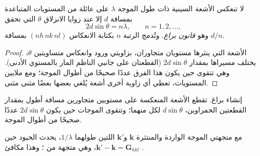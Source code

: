 \begin{theorem}\label{thm:b3:x-ray-diffraction:bragg}
لا تنعكس الأشعة السينية ذات طول الموجة $\lambda$ على عائلة من المستويات المتباعدة بمسافة $d$
إلا عند زوايا الانزلاق $\theta$ التي تحقق
\[
2d\sin\theta = n\lambda, \qquad n = 1, 2, \dots,
\]
وهو \emph{قانون براغ}. وتُدمج الرتبة $n$ بكتابة
الانعكاس $(nh\,nk\,nl)$ بمسافة $d/n$.
\end{theorem}

\begin{proof}
الأشعة التي ينثرها مستويان متجاوران، بزاويتي ورود 
وانعكاس متساويتين $\theta$، يختلف مسيراها بمقدار $2d\sin\theta$ (القطعتان على جانبي
الناظم المار بالمستوي الأدنى). وهي تتقوى حين يكون هذا الفرق
عددًا صحيحًا من أطوال الموجة؛ ومع ملايين المستويات، تعطي أي زاوية أخرى
أشعة يُلغي بعضها بعضًا مثنى مثنى.
\end{proof}

\begin{omfigure}

{\small إنشاء براغ. تقطع الأشعة المنعكسة على مستويين متجاورين
مسافة أطول بمقدار القطعتين الحمراوين، $d\sin\theta$ لكل منهما؛ وتتقوى الموجات حين يكون
$2d\sin\theta$ عددًا صحيحًا من أطوال الموجة.}
\end{omfigure}

\begin{proposition}\label{prop:b3:x-ray-diffraction:laue}
مع متجهتي الموجة الواردة والمنتثرة $\mathbf k$ و$\mathbf k'$ اللتين طولهما
$1/\lambda$، يحدث الحيود حين $\mathbf k' - \mathbf k = \mathbf G_{hkl}$، وهي متجهة من
؛ وهذا مكافئ .
\end{proposition}

